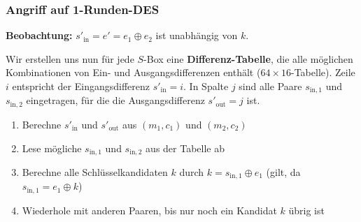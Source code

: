 \documentclass[12pt,A4]{extarticle}
\begin{document}
\subsubsection{Angriff auf 1-Runden-DES}
\textbf{Beobachtung:} $s'_{\text{in}} = e' = e_1 \oplus e_2$ ist unabhängig von $k$.\par
Wir erstellen uns nun für jede $S$-Box eine \textbf{Differenz-Tabelle}, die alle möglichen Kombinationen von Ein- und Ausgangsdifferenzen enthält ($64 \times 16$-Tabelle). Zeile $i$ entspricht der Eingangsdifferenz $s'_{\text{in}} = i$. In Spalte $j$ sind alle Paare $s_{\text{in},1}$ und $s_{\text{in},2}$ eingetragen, für die die Ausgangsdifferenz $s'_{\text{out}} = j$ ist.
\begin{enumerate}
  \item{Berechne $s'_{\text{in}}$ und $s'_{\text{out}}$ aus $(m_1, c_1)$ und $(m_2, c_2)$}
  \item{Lese mögliche $s_{\text{in},1}$ und $s_{\text{in},2}$ aus der Tabelle ab}
  \item{Berechne alle Schlüsselkandidaten $k$ durch $k = s_{\text{in},1} \oplus e_1$ (gilt, da $s_{\text{in},1} = e_1 \oplus k$)}
  \item{Wiederhole mit anderen Paaren, bis nur noch ein Kandidat $k$ übrig ist}
\end{enumerate}
\end{document}

